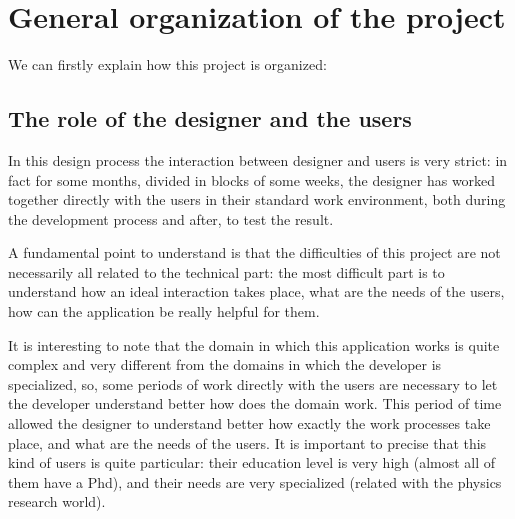 
\chapter{General organization of the project} %

\label{Chapter2} %


We can firstly explain how this project is organized:

\section{The role of the designer and the users}
In this design process the interaction between designer and users is very strict: in fact for some months, divided in blocks of some weeks, the designer has worked together directly with the users in their standard work environment, both during the development process and after, to test the result. 

A fundamental point to understand is that the difficulties of this project are not necessarily all related to the technical part: the most difficult part is to understand how an ideal interaction takes place, what are the needs of the users, how can the application be really helpful for them.
 
It is interesting to note that the domain in which this application works is quite complex and very different from the domains in which the developer is specialized, so, some periods of work directly with the users are necessary to let the developer understand better how does the domain work.
This period of time allowed the designer to understand better how exactly the work processes take place, and what are the needs of the users. 
It is important to precise that this kind of users is quite particular: their education level is very high (almost all of them have a Phd), and their needs are very specialized (related with the physics research world).


